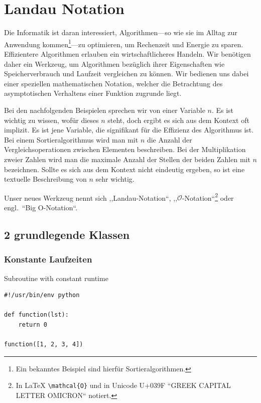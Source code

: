 \chapter{Landau Notation}
%
Die Informatik ist daran interessiert, Algorithmen---so wie sie im Alltag zur Anwendung kommen\footnote{Ein bekanntes Beispiel sind hierfür Sortieralgorithmen.}---zu optimieren, um Rechenzeit und Energie zu sparen. Effizientere Algorithmen erlauben ein wirtschaftlicheres Handeln. Wir benötigen daher ein Werkzeug, um Algorithmen bezüglich ihrer Eigenschaften wie Speicherverbrauch und Laufzeit vergleichen zu können. Wir bedienen uns dabei einer speziellen mathematischen Notation, welcher die Betrachtung des asymptotischen Verhaltens einer Funktion zugrunde liegt.

Bei den nachfolgenden Beispielen sprechen wir von einer Variable $n$. Es ist wichtig zu wissen, wofür dieses $n$ steht, doch ergibt es sich aus dem Kontext oft implizit. Es ist jene Variable, die signifikant für die Effizienz des Algorithmus ist. Bei einem Sortieralgorithmus wird man mit $n$ die Anzahl der Vergleichsoperationen zwischen Elementen beschreiben. Bei der Multiplikation zweier Zahlen wird man die maximale Anzahl der Stellen der beiden Zahlen mit $n$ bezeichnen. Sollte es sich aus dem Kontext nicht eindeutig ergeben, so ist eine textuelle Beschreibung von $n$ sehr wichtig.

Unser neues Werkzeug nennt sich ,,Landau-Notation``, ,,$\mathcal{O}$-Notation``\footnote{In \LaTeX{}  \texttt{\textbackslash mathcal\{O\}} und in Unicode U+039F ``GREEK CAPITAL LETTER OMICRON`` notiert.} oder engl.~``Big O-Notation``.

\section{2 grundlegende Klassen}
\subsection{Konstante Laufzeiten}
%
\begin{algorithm}[p]
\caption{Subroutine with constant runtime}
\label{algo:constant}
\begin{lstlisting}
#!/usr/bin/env python

def function(lst):
    return 0

function([1, 2, 3, 4])
\end{lstlisting}
\end{algorithm}

